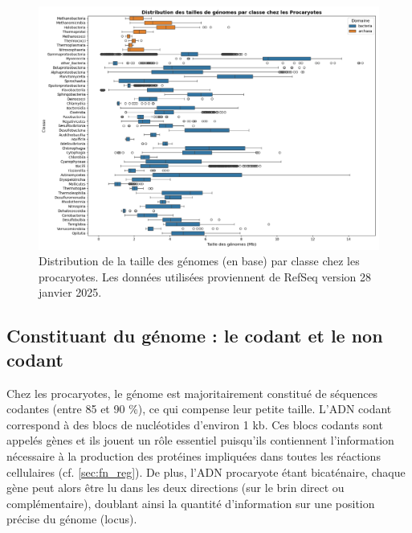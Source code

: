 \begin{figure}[htbp]
    \centering
    \includegraphics[width=\textwidth]{images/genome_sizes_boxplot.png}
    \caption[Distribution de la taille des génomes chez les procaryotes]{Distribution de la taille des génomes (en base) par classe chez les procaryotes. Les données utilisées proviennent de RefSeq version 28 janvier 2025.}
    \label{fig:genome_size}
\end{figure}

\newpage
\subsection{Constituant du génome : le codant et le non codant}
\label{sec:gene}
Chez les procaryotes, le génome est majoritairement constitué de séquences codantes (entre 85 et 90 \%), ce qui compense leur petite taille. 
L'ADN codant correspond à des blocs de nucléotides d’environ 1 kb. Ces blocs codants sont appelés gènes et ils jouent un rôle essentiel puisqu’ils contiennent l’information nécessaire à la production des protéines impliquées dans toutes les réactions cellulaires (cf. \autoref{sec:fn_reg}). De plus, l’ADN procaryote étant bicaténaire, chaque gène peut alors être lu dans les deux directions (sur le brin direct ou complémentaire), doublant ainsi la quantité d'information sur une position précise du génome (locus). 

